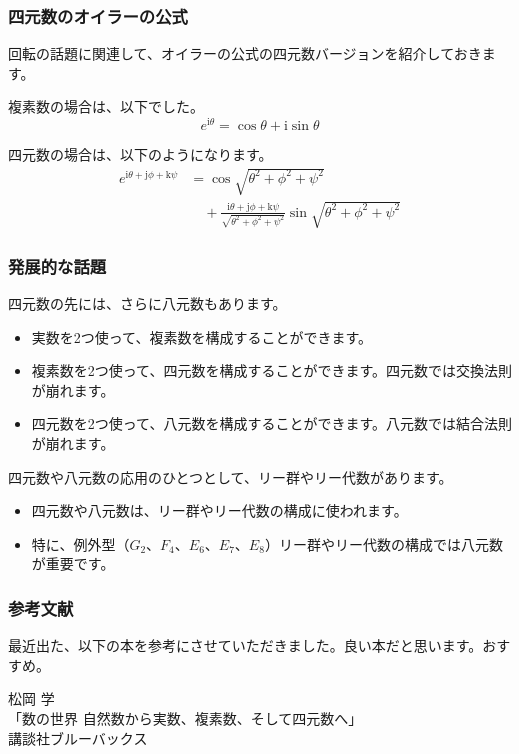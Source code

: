 \documentclass{beamer}
\newcommand{\ii}{\mathrm{i}}
\newcommand{\jj}{\mathrm{j}}
\newcommand{\kk}{\mathrm{k}}
\begin{document}
\begin{frame}
    \frametitle{四元数のオイラーの公式}

    回転の話題に関連して、オイラーの公式の四元数バージョンを紹介しておきます。

    \bigskip

    複素数の場合は、以下でした。
    \[
        e^{\ii \theta} = \cos \theta + \ii \sin \theta
    \]

    四元数の場合は、以下のようになります。
    \begin{align*}
        e^{\ii \theta + \jj \phi + \kk \psi} & = \cos \sqrt{\theta^2 + \phi^2 + \psi^2}                                                                                  \\
                                             & \quad + \frac{\ii \theta + \jj \phi + \kk \psi}{\sqrt{\theta^2 + \phi^2 + \psi^2}} \sin \sqrt{\theta^2 + \phi^2 + \psi^2}
    \end{align*}
\end{frame}

\begin{frame}
    \frametitle{発展的な話題}

    四元数の先には、さらに八元数もあります。
    \begin{itemize}
        \item 実数を2つ使って、複素数を構成することができます。
        \item 複素数を2つ使って、四元数を構成することができます。四元数では交換法則が崩れます。
        \item 四元数を2つ使って、八元数を構成することができます。八元数では結合法則が崩れます。
    \end{itemize}

    \bigskip

    四元数や八元数の応用のひとつとして、リー群やリー代数があります。
    \begin{itemize}
        \item 四元数や八元数は、リー群やリー代数の構成に使われます。
        \item 特に、例外型（\(G_2\)、\(F_4\)、\(E_6\)、\(E_7\)、\(E_8\)）リー群やリー代数の構成では八元数が重要です。
    \end{itemize}
\end{frame}

\begin{frame}
    \frametitle{参考文献}

    最近出た、以下の本を参考にさせていただきました。良い本だと思います。おすすめ。

    \bigskip

    \begin{tcolorbox}
        松岡 学 \\
        「数の世界 自然数から実数、複素数、そして四元数へ」 \\
        講談社ブルーバックス
    \end{tcolorbox}
\end{frame}
\end{document}
